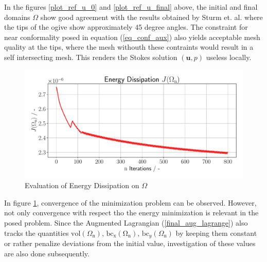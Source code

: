 In the figures \ref{plot_ref_u_0} and \ref{plot_ref_u_final} above, the initial and final domains $\Omega$ 
show good agreement with the results obtained by Sturm et. al. \cite{fully_semi_paper_sturm} where the 
tips of the ogive show approximately 45 degree angles. The constraint for near conformality posed in equation
(\ref{eq_conf_aux}) also yields acceptable mesh quality at the tips, where the mesh withouth these contraints
would result in a self intersecting mesh. This renders the Stokes solution $(\mathbf{u},p)$ useless locally.

\begin{figure}[h]
    \begin{center}
        \includegraphics[width=1\textwidth]{figures/energy_diss_plot.pdf}
        \caption{Evaluation of Energy Dissipation on $\Omega$}
        \label{plot_ref_energy_diss}
    \end{center}
\end{figure}

In figure \ref{plot_ref_energy_diss}, convergence of the minimization problem can be observed. However, not
only convergence with respect tho the energy minimization is relevant in the posed problem. Since the 
Augmented Lagrangian (\ref{final_aug_lagrange}) also tracks the quantities $\mathrm{vol}(\Omega_{\mathrm{n}}), \,
\mathrm{\mathrm{bc}_x(\Omega_{\mathrm{n}})}, \, \mathrm{bc}_y(\Omega_{\mathrm{n}})$ by keeping them constant or rather penalize
deviations from the initial value, investigation of these values are also done subsequently.

